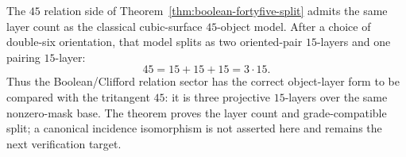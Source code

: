 \makeatletter
{}
\makeatother

\begin{theorem}
\label{thm:relation-fortyfive-three-layers}
The $45$ relation side of Theorem~\ref{thm:boolean-fortyfive-split} admits the
same layer count as the classical cubic-surface $45$-object model.  After a
choice of double-six orientation, that model splits as two oriented-pair
$15$-layers and one pairing $15$-layer:
\[
  45=15+15+15=3\cdot 15.
\]
Thus the Boolean/Clifford relation sector has the correct object-layer form to
be compared with the tritangent $45$: it is three projective $15$-layers over the
same nonzero-mask base.  The theorem proves the layer count and grade-compatible
split; a canonical incidence isomorphism is not asserted here and remains the
next verification target.
\end{theorem}
